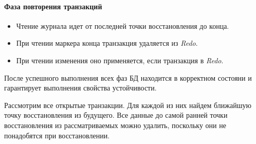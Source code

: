 \paragraph{Фаза повторения транзакций}

\begin{itemize}
    \item Чтение журнала идет от последней точки восстановления до конца.
    \item При чтении маркера конца транзакция удаляется из \textit{Redo}.
    \item При чтении изменения оно применяется, если транзакция в \textit{Redo}.
\end{itemize}

\begin{proposition}
    После успешного выполнения всех фаз БД находится в корректном состояни и
    гарантирует выполнения свойства устойчивости.
\end{proposition}

\begin{proposition}
    Рассмотрим все открытые транзакции. Для каждой из них найдем ближайшую
    точку восстановления из будущего. Все данные до самой ранней точки
    восстановления из рассматриваемых можно удалить, поскольку они не
    понадобятся при восстановлении.
\end{proposition}
